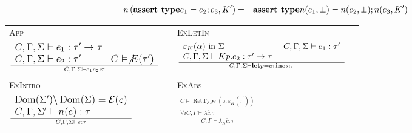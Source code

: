 \documentclass{article}
\newcommand{\tmname}[1]{\textsc{#1}}
\newcommand{\tmop}[1]{\ensuremath{\operatorname{#1}}}
\newcommand{\tmstrong}[1]{\textbf{#1}}
\begin{document}
\begin{table}[t]
\begin{eqnarray*}
    n \left( \text{{\tmstrong{assert type}}} e_1 = e_2 ; e_3, K^{\prime}
    \right) & = & \text{{\tmstrong{assert type}}} n (e_1, \bot) = n (e_2,
    \bot) ; n (e_3, K^{\prime})
  \end{eqnarray*}
  \label{NormExpr}
  \caption{Flatten nested introductions of existential types}
\end{table}\begin{table}[t]
  \begin{itemize}
    \begin{tabular}{llll}
      {\tmname{App}} &  & {\tmname{ExLetIn}} & \\
      $\large{\frac{\begin{array}{ll}
        C, \Gamma, \Sigma \vdash e_1 : \tau^{\prime} \rightarrow \tau & \\
        C, \Gamma, \Sigma \vdash e_2 : \tau^{\prime} & C \vDash \not{E}
        (\tau^{\prime})
      \end{array}}{C, \Gamma, \Sigma \vdash e_1 e_2 : \tau}}$ &  &
      {\large{$\frac{\begin{array}{ll}
        \varepsilon_K (\bar{\alpha}) \text{ in } \Sigma & \text{ } C, \Gamma,
        \Sigma \vdash e_1 : \tau^{\prime}\\
        C, \Gamma, \Sigma \vdash K p.e_2 : \tau^{\prime} \rightarrow \tau & 
      \end{array}}{C, \Gamma, \Sigma \vdash^{} \text{{\tmstrong{let}}} p = e_1
      \text{{\tmstrong{in}}} e_2 : \tau}$}} & \\
      &  &  & \\
      {\tmname{ExIntro}} &  & {\tmname{ExAbs}} & \\
      $\large{\frac{\begin{array}{l}
        \tmop{Dom} (\Sigma^{\prime}) \backslash \tmop{Dom} (\Sigma)
        =\mathcal{E} (e)\\
        C, \Gamma, \Sigma^{\prime} \vdash n (e) : \tau
      \end{array}}{C, \Gamma, \Sigma \vdash e : \tau}}$ &  &
      {\large{$\frac{\begin{array}{l}
        C \vDash \tmop{RetType} (\tau, \varepsilon_K (\bar{\tau}^{\prime}))\\
        \forall i C, \Gamma \vdash \lambda \bar{c} : \tau_{}
      \end{array}}{C, \Gamma \vdash \lambda_K \bar{c} : \tau}$}} & 
    \end{tabular}
    

\end{itemize}
\end{table}
\end{document}
